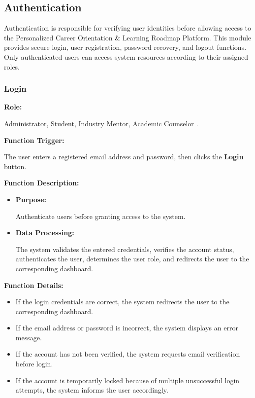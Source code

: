 \subsection{Authentication}

Authentication is responsible for verifying user identities before allowing access to the Personalized Career Orientation \& Learning Roadmap Platform. This module provides secure login, user registration, password recovery, and logout functions. Only authenticated users can access system resources according to their assigned roles.

\subsubsection{Login}

\textbf{Role:}

Administrator, Student, Industry Mentor, Academic Counselor .

\vspace{0.3cm}

\textbf{Function Trigger:}

The user enters a registered email address and password, then clicks the \textbf{Login} button.

\vspace{0.3cm}

\textbf{Function Description:}

\begin{itemize}
    \item \textbf{Purpose:}

    Authenticate users before granting access to the system.

    \item \textbf{Data Processing:}

    The system validates the entered credentials, verifies the account status, authenticates the user, determines the user role, and redirects the user to the corresponding dashboard.
\end{itemize}

\vspace{0.3cm}

\textbf{Function Details:}

\begin{itemize}
    \item If the login credentials are correct, the system redirects the user to the corresponding dashboard.

    \item If the email address or password is incorrect, the system displays an error message.

    \item If the account has not been verified, the system requests email verification before login.

    \item If the account is temporarily locked because of multiple unsuccessful login attempts, the system informs the user accordingly.
\end{itemize}

